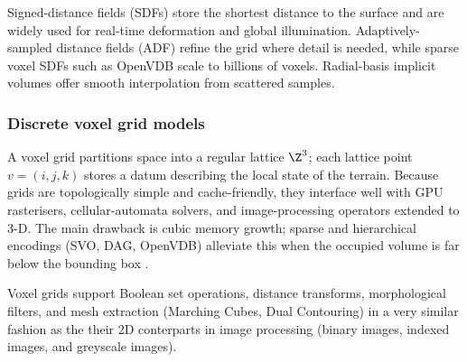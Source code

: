 Signed-distance fields (SDFs) store the shortest distance to the surface and are widely used for real-time deformation and global illumination. Adaptively-sampled distance fields (ADF) \cite{Frisken2000} refine the grid where detail is needed, while sparse voxel SDFs such as OpenVDB scale to billions of voxels. Radial-basis implicit volumes offer smooth interpolation from scattered samples.

\subsubsection{Discrete voxel grid models}
A voxel grid partitions space into a regular lattice $\Z^{3}$; each lattice point $v=(i,j,k)$ stores a datum describing the local state of the terrain. Because grids are topologically simple and cache-friendly, they interface well with GPU rasterisers, cellular-automata solvers, and image-processing operators extended to 3-D. The main drawback is cubic memory growth; sparse and hierarchical encodings (SVO, DAG, OpenVDB) alleviate this when the occupied volume is far below the bounding box
\cite{Laine2010,Villanueva2017,Museth2013}.

Voxel grids support Boolean set operations, distance transforms, morphological filters, and mesh extraction (Marching Cubes, Dual Contouring) in a very similar fashion as the their 2D conterparts in image processing (binary images, indexed images, and greyscale images).





